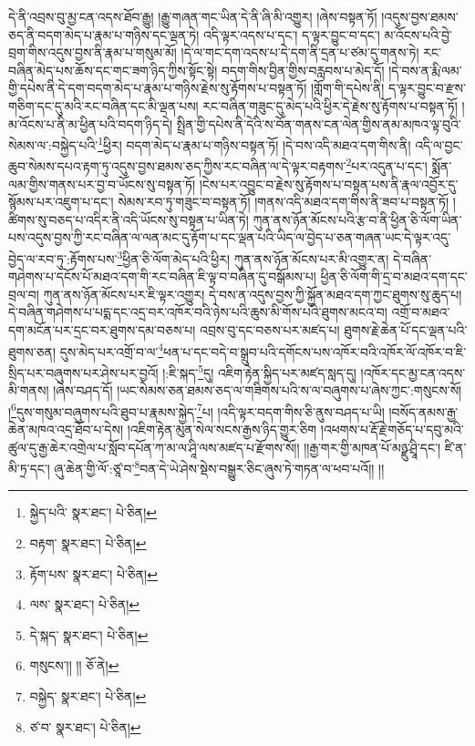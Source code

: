 དེ་ནི་འབྲས་བུ་མྱ་ངན་འདས་ཐོབ་རྒྱུ། །རྒྱུ་གཞན་གང་ཡིན་དེ་ནི་ཞི་མི་འགྱུར། །ཞེས་བསྟན་ཏོ། །འདུས་བྱས་ཐམས་ཅད་ནི་བདག་མེད་པ་རྣམ་པ་གཉིས་དང་ལྡན་ཏེ། འདི་ལྟར་འདས་པ་དང་། ད་ལྟར་བྱུང་བ་དང་། མ་འོངས་པའི་བྱེ་བྲག་གིས་འདུས་བྱས་ནི་རྣམ་པ་གསུམ་མོ། །དེ་ལ་གང་དག་འདས་པ་དེ་དག་ནི་དྲན་པ་ཙམ་དུ་གནས་ཏེ། རང་བཞིན་མེད་པས་ཆོས་དང་གང་ཟག་ཉིད་ཀྱིས་སྟོང་སྟེ། བདག་གིས་བྱིན་གྱིས་བརླབས་པ་མེད་དོ། །དེ་བས་ན་རྨི་ལམ་གྱི་དཔེས་ནི་དེ་དག་བདག་མེད་པ་རྣམ་པ་གཉིས་རྗེས་སུ་རྟོགས་པ་བསྟན་ཏོ། །གློག་གི་དཔེས་ནི། ད་ལྟར་བྱུང་བ་རྫས་གཅིག་དང་དུ་མའི་རང་བཞིན་དང་མི་ལྡན་པས། རང་བཞིན་གཟུང་དུ་མེད་པའི་ཕྱིར་དེ་རྗེས་སུ་རྟོགས་པ་བསྟན་ཏོ། །མ་འོངས་པ་ནི་མ་ཕྱིན་པའི་བདག་ཉིད་དེ། སྤྲིན་གྱི་དཔེས་ནི་དེའི་ས་བོན་གནས་ངན་ལེན་གྱིས་ནམ་མཁའ་ལྟ་བུའི་སེམས་ལ་:བསྐྱེད་པའི་\footnote{སྐྱེད་པའི་  སྣར་ཐང་།  པེ་ཅིན། }ཕྱིར། བདག་མེད་པ་རྣམ་པ་གཉིས་བསྟན་ཏོ། །དེ་བས་འདི་མཐའ་དག་གིས་ནི། འདི་ལ་བྱང་ཆུབ་སེམས་དཔའ་རྟག་ཏུ་འདུས་བྱས་ཐམས་ཅད་ཀྱིས་རང་བཞིན་ལ་དེ་ལྟར་བརྟགས་\footnote{བརྟག་  སྣར་ཐང་།  པེ་ཅིན། }པར་འདུན་པ་དང་། སྨོན་ལམ་གྱིས་གནས་པར་བྱ་བ་ཡོངས་སུ་བསྟན་ཏོ། །ངེས་པར་འབྱུང་བ་རྗེས་སུ་རྟོགས་པ་བསྟན་པས་ནི་རྣལ་འབྱོར་དུ་སྙོམས་པར་འཇུག་པ་དང་། སེམས་རབ་ཏུ་གཟུང་བ་བསྟན་ཏོ། །གནས་འདི་མཐའ་དག་གིས་ནི་ཟབ་པ་བསྟན་ཏོ། །ཚིགས་སུ་བཅད་པ་འདིར་ནི་འདི་ཡོངས་སུ་བསྟན་པ་ཡིན་ཏེ། ཀུན་ནས་ཉོན་མོངས་པའི་རྩ་བ་ནི་ཕྱིན་ཅི་ལོག་ཡིན་པས་འདུས་བྱས་ཀྱི་རང་བཞིན་ལ་ལན་མང་དུ་རྟོག་པ་དང་ལྡན་པའི་ཡིད་ལ་བྱེད་པ་ཅན་གཞན་ཡང་དེ་ལྟར་འདུ་བྱེད་ལ་རབ་ཏུ་:རྟོགས་པས་\footnote{རྟོག་པས་  སྣར་ཐང་།  པེ་ཅིན། }ཕྱིན་ཅི་ལོག་མེད་པའི་ཕྱིར། ཀུན་ནས་ཉོན་མོངས་པར་མི་འགྱུར་ན། དེ་བཞིན་གཤེགས་པ་དངོས་པོ་མཐའ་དག་གི་རང་བཞིན་ཇི་ལྟ་བ་བཞིན་དུ་བསྒོམས་པ། ཕྱིན་ཅི་ལོག་གི་དྲ་བ་མཐའ་དག་དང་བྲལ་བ། ཀུན་ནས་ཉོན་མོངས་པར་ཇི་ལྟར་འགྱུར། དེ་བས་ན་འདུས་བྱས་ཀྱི་སྐྱོན་མཐའ་དག་ཀྱང་ཐུགས་སུ་ཆུད་པ། དེ་བཞིན་གཤེགས་པ་པདྨ་དང་འདྲ་བར་འཁོར་བའི་ཉེས་པའི་ཆུས་མི་གོས་པའི་ཐུགས་མངའ་བ། འགྲོ་བ་མཐའ་དག་མངོན་པར་དྲང་བར་ཐུགས་དམ་བཅས་པ། འབྲས་བུ་དང་བཅས་པར་མཛད་པ། ཐུགས་རྗེ་ཆེན་པོ་དང་ལྡན་པའི་ཐུགས་ཅན། དུས་མེད་པར་འགྲོ་བ་ལ་\footnote{ལས་  སྣར་ཐང་།  པེ་ཅིན། }ཕན་པ་དང་བདེ་བ་སྒྲུབ་པའི་དགོངས་པས་འཁོར་བའི་འཁོར་ལོ་འཁོར་བ་ཇི་སྲིད་པར་བཞུགས་པར་ཤེས་པར་བྱའོ། །:ཇི་སྐད་\footnote{དེ་སྐད་  སྣར་ཐང་།  པེ་ཅིན། }དུ། འཇིག་རྟེན་སྐྱིད་པར་མཛད་སླད་དུ། །འཁོར་དང་མྱ་ངན་འདས་མི་གནས། །ཞེས་བཤད་དོ། །ཡང་སེམས་ཅན་ཐམས་ཅད་ལ་གཟིགས་པའི་ས་ལ་བཞུགས་པ་ཞེས་ཀྱང་:གསུངས་སོ། །\footnote{གསུངས་།། །།  ཅོ་ནེ། }དུས་གསུམ་བཞུགས་པའི་ཐུབ་པ་རྣམས་སྐྱེད་\footnote{བསྐྱེད་  སྣར་ཐང་།  པེ་ཅིན། }པ། །འདི་ལྟར་བདག་གིས་ཅི་ནུས་བཤད་པ་ཡི། །བསོད་ནམས་རྒྱ་ཆེན་མཁའ་འདྲ་ཐོབ་པ་དེས། །འཇིག་རྟེན་མུན་སེལ་སངས་རྒྱས་ཉིད་གྱུར་ཅིག །འཕགས་པ་རྡོ་རྗེ་གཅོད་པ་དབུ་མའི་ཚུལ་དུ་རྒྱ་ཆེར་འགྲེལ་པ་སློབ་དཔོན་ཀ་མ་ལ་ཤཱི་ལས་མཛད་པ་རྫོགས་སོ།། །།རྒྱ་གར་གྱི་མཁན་པོ་མཉྫུ་ཤྲཱི་དང་། ཛི་ན་མི་ཏྲ་དང་། ཞུ་ཆེན་གྱི་ལོ་:ཙཱ་བ་\footnote{ཙ་བ་  སྣར་ཐང་།  པེ་ཅིན། }བན་དེ་ཡེ་ཤེས་སྡེས་བསྒྱུར་ཅིང་ཞུས་ཏེ་གཏན་ལ་ཕབ་པའོ།། །།